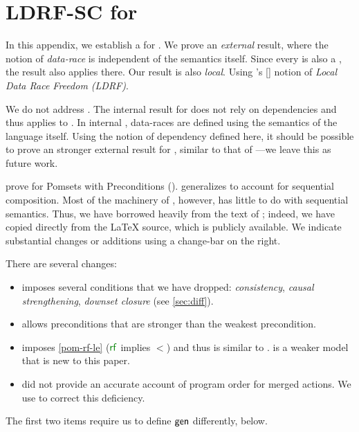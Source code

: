 \section{LDRF-SC for \PwTmcaTITLE{}}
\label{sec:sc}


\begin{changed}
  In this appendix, we establish a \drfsc{} for .  We prove an
  \emph{external} result, where the notion of \emph{data-race} is independent
  of the semantics itself.  Since every  is also a , the
  result also applies there.  Our result is also \emph{local}.  Using
  \citeauthor{Dolan:2018:BDR:3192366.3192421}'s
  [\citeyear{Dolan:2018:BDR:3192366.3192421}] notion of \emph{Local Data Race
    Freedom (LDRF)}.

  We do not address \PwTc{}.  The internal \drfsc{} result for \cXI{}
  \cite{DBLP:phd/ethos/Batty15} does not rely on dependencies and thus
  applies to \PwTc{}.  In internal \drfsc{}, data-races are defined using the
  semantics of the language itself.  Using the notion of dependency defined
  here, it should be possible to prove an stronger external result for
  \cXI{}, similar to that of \cite{DBLP:conf/pldi/LahavVKHD17}---we leave
  this as future work.

  \citet{DBLP:journals/pacmpl/JagadeesanJR20} prove \ldrfsc{} for Pomsets
  with Preconditions (\PwP{}).  \PwTmca{} generalizes \PwP{} to account for
  sequential composition.  Most of the machinery of \ldrfsc{}, however, has
  little to do with sequential semantics.  Thus, we have borrowed heavily
  from the text of \cite{DBLP:journals/pacmpl/JagadeesanJR20}; indeed, we
  have copied directly from the \LaTeX{} source, which is publicly available.
  We indicate substantial changes or additions using a change-bar on the
  right.

  There are several changes:
  \begin{itemize}
  \item \PwP{} imposes several conditions that we have dropped:
    \emph{consistency}, \emph{causal strengthening}, \emph{downset closure}
    (see \textsection\ref{sec:diff}).
  \item \PwP{} allows preconditions that are stronger than the weakest precondition.
  \item \PwP{} imposes \ref{pom-rf-le} ($\rrfx$ implies $\lt$) and thus is
    similar to .   is a weaker model that is new to this
    paper.  %
  \item \PwP{} did not provide an accurate account of program order for
    merged actions.  We use  to correct this deficiency.
  \end{itemize}
  The first two items require us to define $\semmin{}$ differently, below.
\end{changed}

